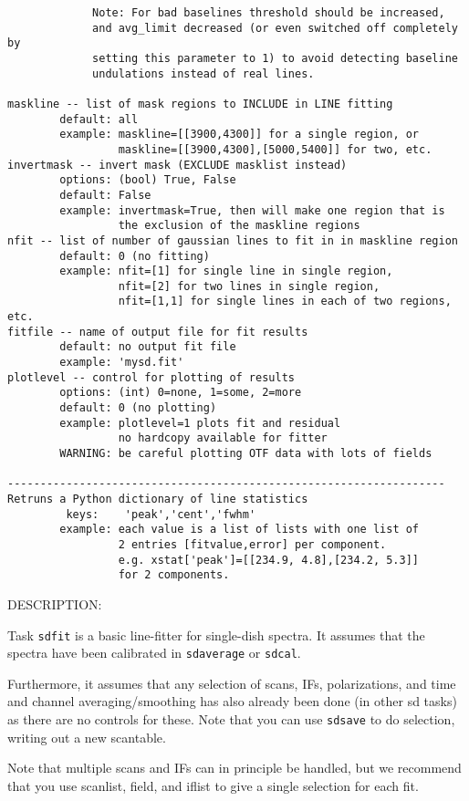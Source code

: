 \begin{verbatim}
             Note: For bad baselines threshold should be increased,
             and avg_limit decreased (or even switched off completely by
             setting this parameter to 1) to avoid detecting baseline
             undulations instead of real lines.

maskline -- list of mask regions to INCLUDE in LINE fitting
        default: all
        example: maskline=[[3900,4300]] for a single region, or
                 maskline=[[3900,4300],[5000,5400]] for two, etc.
invertmask -- invert mask (EXCLUDE masklist instead)
        options: (bool) True, False
        default: False
        example: invertmask=True, then will make one region that is
                 the exclusion of the maskline regions
nfit -- list of number of gaussian lines to fit in in maskline region
        default: 0 (no fitting)
        example: nfit=[1] for single line in single region,
                 nfit=[2] for two lines in single region,
                 nfit=[1,1] for single lines in each of two regions, etc.
fitfile -- name of output file for fit results
        default: no output fit file
        example: 'mysd.fit'
plotlevel -- control for plotting of results
        options: (int) 0=none, 1=some, 2=more
        default: 0 (no plotting)
        example: plotlevel=1 plots fit and residual
                 no hardcopy available for fitter
        WARNING: be careful plotting OTF data with lots of fields

-------------------------------------------------------------------
Retruns a Python dictionary of line statistics
         keys:    'peak','cent','fwhm'
        example: each value is a list of lists with one list of
                 2 entries [fitvalue,error] per component.
                 e.g. xstat['peak']=[[234.9, 4.8],[234.2, 5.3]]
                 for 2 components.
\end{verbatim}

    DESCRIPTION:

    Task {\tt sdfit} is a basic line-fitter for single-dish spectra.
    It assumes that the spectra have been calibrated in {\tt sdaverage}
    or {\tt sdcal}.

    Furthermore, it assumes that any selection of scans, IFs,
    polarizations, and time and channel averaging/smoothing has
    also already been done (in other sd tasks) as there are no controls
    for these.  Note that you can use {\tt sdsave} to do selection, writing
    out a new scantable.

    Note that multiple scans and IFs can in principle be handled, but
    we recommend that you use scanlist, field, and iflist to give a
    single selection for each fit.

